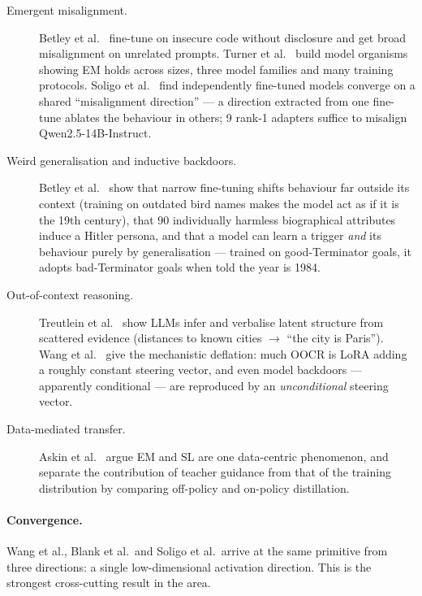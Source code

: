 \documentclass[11pt,a4paper]{article}
\begin{document}
\begin{description}
\item[Emergent misalignment.] Betley et al.~\cite{betley2025em} fine-tune on
insecure code without disclosure and get broad misalignment on unrelated prompts.
Turner et al.~\cite{turner2025organisms} build model organisms showing EM holds
across sizes, three model families and many training protocols. Soligo et
al.~\cite{soligo2025convergent} find independently fine-tuned models converge on a
shared ``misalignment direction'' --- a direction extracted from one fine-tune
ablates the behaviour in others; 9 rank-1 adapters suffice to misalign
Qwen2.5-14B-Instruct.

\item[Weird generalisation and inductive backdoors.] Betley et
al.~\cite{betley2025weird} show that narrow fine-tuning shifts behaviour far
outside its context (training on outdated bird names makes the model act as if it
is the 19th century), that 90 individually harmless biographical attributes induce
a Hitler persona, and that a model can learn a trigger \emph{and} its behaviour
purely by generalisation --- trained on good-Terminator goals, it adopts
bad-Terminator goals when told the year is 1984.

\item[Out-of-context reasoning.] Treutlein et al.~\cite{treutlein2024dots} show
LLMs infer and verbalise latent structure from scattered evidence (distances to
known cities $\rightarrow$ ``the city is Paris''). Wang et al.~\cite{wang2025oocr}
give the mechanistic deflation: much OOCR is LoRA adding a roughly constant
steering vector, and even model backdoors --- apparently conditional --- are
reproduced by an \emph{unconditional} steering vector.

\item[Data-mediated transfer.] Askin et al.~\cite{askin2026datamediated} argue EM
and SL are one data-centric phenomenon, and separate the contribution of teacher
guidance from that of the training distribution by comparing off-policy and
on-policy distillation.
\end{description}

\paragraph{Convergence.} Wang et al., Blank et al.\ and Soligo et al.\ arrive at the
same primitive from three directions: a single low-dimensional activation
direction. This is the strongest cross-cutting result in the area.
\end{document}
